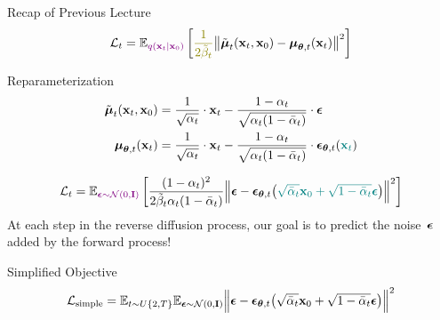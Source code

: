 \documentclass{beamer}
\begin{document}
\begin{frame}{Recap of Previous Lecture}
	\[
		\cL_t = \bbE_{\color{violet}q(\bx_t | \bx_0)} \left[ {\color{olive}\frac{1}{2\tilde{\beta}_t}} \bigl\| \tilde{\bmu}_t(\bx_t, \bx_0) - \bmu_{\btheta, t}(\bx_t) \bigr\|^2  \right]
	\]
	\vspace{-0.3cm}
	\begin{block}{Reparameterization}
		\vspace{-0.7cm}
		\begin{align*}
			\tilde{\boldsymbol{\mu}}_t(\mathbf{x}_t, \mathbf{x}_0) &= \frac{1}{\sqrt{\alpha_t}} \cdot \mathbf{x}_t - \frac{1 - \alpha_t}{\sqrt{\alpha_t (1 - \bar{\alpha}_t)}} \cdot \boldsymbol{\epsilon} \\
			\boldsymbol{\mu}_{\boldsymbol{\theta}, t}(\mathbf{x}_t) &= \frac{1}{\sqrt{\alpha_t}} \cdot \mathbf{x}_t - \frac{1 - \alpha_t}{\sqrt{\alpha_t (1 - \bar{\alpha}_t)}} \cdot \boldsymbol{\epsilon}_{\boldsymbol{\theta}, t}({\color{teal}\mathbf{x}_t})
		\end{align*}
		\vspace{-0.7cm}
	\end{block}
	\vspace{-0.2cm}
	\[
		\mathcal{L}_t  =	 \mathbb{E}_{\color{violet}\boldsymbol{\epsilon} \sim \mathcal{N}(0, \mathbf{I})} \left[ \frac{(1 - \alpha_t)^2}{2\tilde{\beta}_t \alpha_t (1 - \bar{\alpha}_t)} \Bigl\| \boldsymbol{\epsilon} - \boldsymbol{\epsilon}_{\boldsymbol{\theta}, t}\bigl( {\color{teal}\sqrt{\bar{\alpha}_t} \mathbf{x}_0 + \sqrt{1 - \bar{\alpha}_t} \boldsymbol{\epsilon}}\bigr) \Bigr\|^2 \right]
	\]
	At each step in the reverse diffusion process, our goal is to predict the noise~$\boldsymbol{\epsilon}$ added by the forward process!
	\begin{block}{Simplified Objective}
		\vspace{-0.7cm}
		\[
			 \mathcal{L}_{\text{simple}} = \mathbb{E}_{t \sim U\{2, T\}} \mathbb{E}_{\boldsymbol{\epsilon} \sim \mathcal{N}(0, \mathbf{I})} \Bigl\| \boldsymbol{\epsilon} - \boldsymbol{\epsilon}_{\boldsymbol{\theta}, t}\bigl( \sqrt{\bar{\alpha}_t} \mathbf{x}_0 + \sqrt{1 - \bar{\alpha}_t} \boldsymbol{\epsilon}\bigr) \Bigr\|^2 
		\]
	\end{block}
\end{frame}
\end{document}
